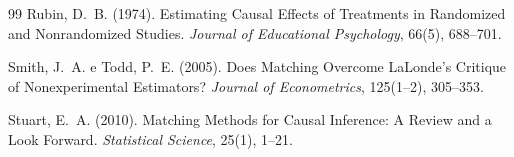 \documentclass[12pt,a4paper]{article}
\begin{document}
\begin{thebibliography}{99}
Rubin, D.~B. (1974).
\newblock Estimating Causal Effects of Treatments in Randomized and Nonrandomized Studies.
\newblock \textit{Journal of Educational Psychology}, 66(5), 688--701.

Smith, J.~A. e Todd, P.~E. (2005).
\newblock Does Matching Overcome LaLonde's Critique of Nonexperimental Estimators?
\newblock \textit{Journal of Econometrics}, 125(1--2), 305--353.

Stuart, E.~A. (2010).
\newblock Matching Methods for Causal Inference: A Review and a Look Forward.
\newblock \textit{Statistical Science}, 25(1), 1--21.

\end{thebibliography}
\end{document}
